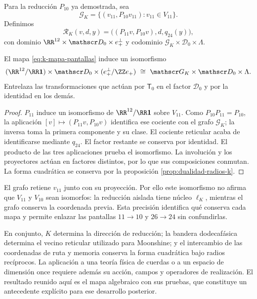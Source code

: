 Para la reducción \(P_{10}\) ya demostrada, sea
\[
 \mathscr G_K=\{(v_{11},P_{10}v_{11}):v_{11}\in V_{11}\}.
\]
Definimos
\begin{equation}
 \mathcal R_K(v,d,y)
 =\bigl((P_{11}v,P_{10}v),d,q_{24}(y)\bigr),
 \label{eq:k-mapa-pantallas}
\end{equation}
con dominio \(\RR^{12}\times\mathscr D_0\times e_+^\perp\)
y codominio \(\mathscr G_K\times\mathscr D_0\times\Lambda\).

\begin{theorem}
\label{thm:k-pantallas-coordinadas}
El mapa \eqref{eq:k-mapa-pantallas} induce un isomorfismo
\[
 (\RR^{12}/\RR\mathbf1)\times\mathscr D_0
       \times(e_+^\perp/\ZZ e_+)
 \ \cong\ \mathscr G_K\times\mathscr D_0\times\Lambda.
\]
Entrelaza las transformaciones que actúan por \(\mathsf T_0\)
en el factor \(\mathscr D_0\) y por la identidad en los demás.
\end{theorem}
\begin{proof}
\(P_{11}\) induce un isomorfismo de \(\RR^{12}/\RR\mathbf1\)
sobre \(V_{11}\). Como \(P_{10}P_{11}=P_{10}\), la aplicación
\([v]\mapsto(P_{11}v,P_{10}v)\) identifica ese cociente con
el grafo \(\mathscr G_K\); la inversa toma la primera componente
y su clase. El cociente reticular acaba de identificarse mediante
\(q_{24}\). El factor restante se conserva por identidad.
El producto de las tres aplicaciones prueba el isomorfismo. La
involución y los proyectores actúan en factores distintos, por lo
que sus composiciones conmutan. La forma cuadrática se conserva
por la proposición \ref{prop:dualidad-radios-k}.
\end{proof}

El grafo retiene \(v_{11}\) junto con su proyección. Por ello este
isomorfismo no afirma que \(V_{11}\) y \(V_{10}\) sean isomorfos:
la reducción aislada tiene núcleo \(\ell_K\), mientras el grafo
conserva la coordenada previa. Esta precisión identifica qué conserva
cada mapa y permite enlazar las pantallas \(11\to10\) y
\(26\to24\) sin confundirlas.

En conjunto, \(K\) determina la dirección de reducción; la bandera
dodecafásica determina el vecino reticular utilizado para Moonshine;
y el intercambio de las coordenadas de ruta y memoria conserva la
forma cuadrática bajo radios recíprocos. La aplicación a una teoría
física de cuerdas o a un espacio de dimensión once requiere además
su acción, campos y operadores de realización. El resultado reunido
aquí es el mapa algebraico con sus pruebas, que constituye un
antecedente explícito para ese desarrollo posterior.
